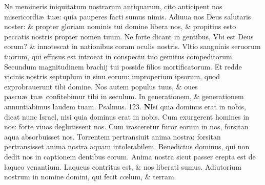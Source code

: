 \documentclass[a5paper,10pt]{book}
\def\ae{æ}
\def\oe{œ}
\begin{document}
\begin{multicols*}{2}
\newline \color{red} N\color{black}e memineris iniquitatum nostrarum antiquarum, cito anticipent nos misericordi\ae \ tu\ae : quia pauperes facti sumus nimis.
\newline \color{red} A\color{black}diuua nos Deus salutaris noster: \& propter gloriam nominis tui domine libera nos, \& propitius esto peccatis nostris propter nomen tuum.
\newline \color{red} N\color{black}e forte dicant in gentibus, Vbi est Deus eorum? \& innotescat in nationibus coram oculis nostris.
\newline \color{red} V\color{black}ltio sanguinis seruorum tuorum, qui effusus est introeat in conspectu tuo gemitus compeditorum.
\newline \color{red} S\color{black}ecundum magnitudinem brachij tui posside filios mortificatorum.
\newline \color{red} E\color{black}t redde vicinis nostris septuplum in sinu eorum: improperium ipsorum, quod exprobrauerunt tibi domine.
\newline \color{red} N\color{black}os autem populus tuus, \& oues pascu\ae \ tu\ae \ confitebimur tibi in seculum.
\newline \color{red} I\color{black}n generationem, \& generationem annuntiabimus laudem tuam.
\newline \color{red} Psalmus. 123. \color{black}
\lettrine[lines=2]{\bfseries \color{red} N}{}Isi quia dominus erat in nobis, dicat nunc Israel, nisi quia dominus erat in nobis.
\newline \color{red} C\color{black}um exurgerent homines in nos: forte viuos deglutissent nos.
\newline \color{red} C\color{black}um irasceretur furor eorum in nos, forsitan aqua absorbuisset nos.
\newline \color{red} T\color{black}orrentem pertransiuit anima nostra: forsitan pertransisset anima nostra aquam intolerabilem.
\newline \color{red} B\color{black}enedictus dominus, qui non dedit nos in captionem dentibus eorum.
\newline \color{red} A\color{black}nima nostra sicut passer erepta est de laqueo venantium.
\newline \color{red} L\color{black}aqueus contritus est, \& nos liberati sumus.
\newline \color{red} A\color{black}diutorium nostrum in nomine domini, qui fecit c\oe lum, \& terram.

\end{multicols*}
\end{document}

